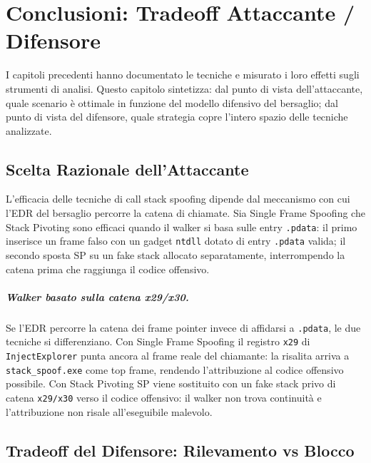 \chapter{Conclusioni: Tradeoff Attaccante / Difensore}
\label{ch:conclusioni}

I capitoli precedenti hanno documentato le tecniche e misurato i loro effetti
sugli strumenti di analisi. Questo capitolo sintetizza: dal punto di vista
dell'attaccante, quale scenario è ottimale in funzione del modello difensivo
del bersaglio; dal punto di vista del difensore, quale strategia copre l'intero
spazio delle tecniche analizzate.


\section{Scelta Razionale dell'Attaccante}

L'efficacia delle tecniche di call stack spoofing dipende dal meccanismo con
cui l'EDR del bersaglio percorre la catena di chiamate. Sia Single Frame
Spoofing che Stack Pivoting sono efficaci quando il walker si basa sulle entry
\texttt{.pdata}: il primo inserisce un frame falso con un gadget \texttt{ntdll}
dotato di entry \texttt{.pdata} valida; il secondo sposta SP su un fake stack
allocato separatamente, interrompendo la catena prima che raggiunga il codice
offensivo.

\paragraph{Walker basato sulla catena x29/x30.}
Se l'EDR percorre la catena dei frame pointer invece di affidarsi a
\texttt{.pdata}, le due tecniche si differenziano. Con Single Frame Spoofing
il registro \texttt{x29} di \texttt{InjectExplorer} punta ancora al frame reale
del chiamante: la risalita arriva a \texttt{stack\_spoof.exe} come top frame,
rendendo l'attribuzione al codice offensivo possibile. Con Stack Pivoting SP
viene sostituito con un fake stack privo di catena \texttt{x29/x30} verso il
codice offensivo: il walker non trova continuità e l'attribuzione non risale
all'eseguibile malevolo.



\section{Tradeoff del Difensore: Rilevamento vs Blocco}

